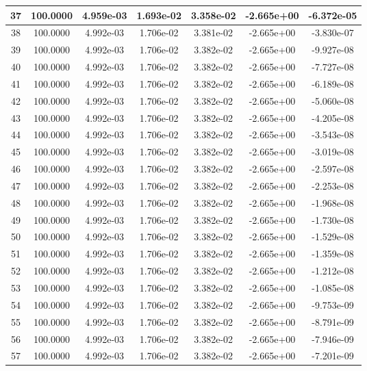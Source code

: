 \documentclass[10pt]{report}
\begin{document}
\begin{table}[H]
\begin{center}
\begin{tabular}{|c|c|c|c|c|c|c|}
37 & 100.0000 & 4.959e-03 & 1.693e-02 & 3.358e-02 & -2.665e+00 & -6.372e-05\\ \hline
38 & 100.0000 & 4.992e-03 & 1.706e-02 & 3.381e-02 & -2.665e+00 & -3.830e-07\\ \hline
39 & 100.0000 & 4.992e-03 & 1.706e-02 & 3.382e-02 & -2.665e+00 & -9.927e-08\\ \hline
40 & 100.0000 & 4.992e-03 & 1.706e-02 & 3.382e-02 & -2.665e+00 & -7.727e-08\\ \hline
41 & 100.0000 & 4.992e-03 & 1.706e-02 & 3.382e-02 & -2.665e+00 & -6.189e-08\\ \hline
42 & 100.0000 & 4.992e-03 & 1.706e-02 & 3.382e-02 & -2.665e+00 & -5.060e-08\\ \hline
43 & 100.0000 & 4.992e-03 & 1.706e-02 & 3.382e-02 & -2.665e+00 & -4.205e-08\\ \hline
44 & 100.0000 & 4.992e-03 & 1.706e-02 & 3.382e-02 & -2.665e+00 & -3.543e-08\\ \hline
45 & 100.0000 & 4.992e-03 & 1.706e-02 & 3.382e-02 & -2.665e+00 & -3.019e-08\\ \hline
46 & 100.0000 & 4.992e-03 & 1.706e-02 & 3.382e-02 & -2.665e+00 & -2.597e-08\\ \hline
47 & 100.0000 & 4.992e-03 & 1.706e-02 & 3.382e-02 & -2.665e+00 & -2.253e-08\\ \hline
48 & 100.0000 & 4.992e-03 & 1.706e-02 & 3.382e-02 & -2.665e+00 & -1.968e-08\\ \hline
49 & 100.0000 & 4.992e-03 & 1.706e-02 & 3.382e-02 & -2.665e+00 & -1.730e-08\\ \hline
50 & 100.0000 & 4.992e-03 & 1.706e-02 & 3.382e-02 & -2.665e+00 & -1.529e-08\\ \hline
51 & 100.0000 & 4.992e-03 & 1.706e-02 & 3.382e-02 & -2.665e+00 & -1.359e-08\\ \hline
52 & 100.0000 & 4.992e-03 & 1.706e-02 & 3.382e-02 & -2.665e+00 & -1.212e-08\\ \hline
53 & 100.0000 & 4.992e-03 & 1.706e-02 & 3.382e-02 & -2.665e+00 & -1.085e-08\\ \hline
54 & 100.0000 & 4.992e-03 & 1.706e-02 & 3.382e-02 & -2.665e+00 & -9.753e-09\\ \hline
55 & 100.0000 & 4.992e-03 & 1.706e-02 & 3.382e-02 & -2.665e+00 & -8.791e-09\\ \hline
56 & 100.0000 & 4.992e-03 & 1.706e-02 & 3.382e-02 & -2.665e+00 & -7.946e-09\\ \hline
57 & 100.0000 & 4.992e-03 & 1.706e-02 & 3.382e-02 & -2.665e+00 & -7.201e-09\\ \hline

\end{tabular}
\end{center}
\end{table}
\end{document}
